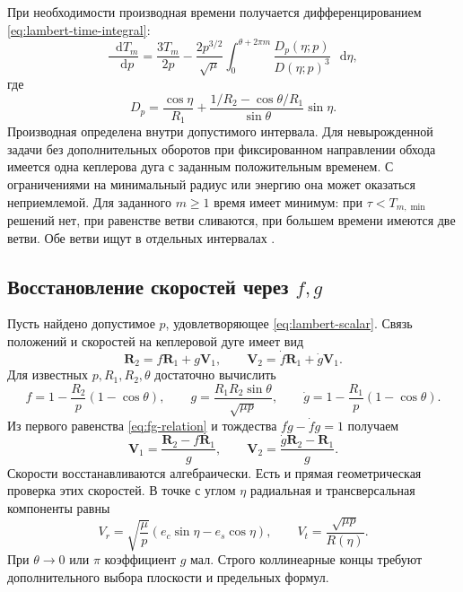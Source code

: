 \documentclass[a4paper,11pt]{article}
\newcommand{\dd}{\mathop{}\!\mathrm d}
\numberwithin{equation}{section}
\theoremstyle{remark}
\newcommand{\vect}[1]{\boldsymbol{#1}}
\begin{document}
При необходимости производная времени получается
дифференцированием \eqref{eq:lambert-time-integral}:
\begin{equation}
 \frac{\dd T_m}{\dd p}
 =\frac{3T_m}{2p}
  -\frac{2p^{3/2}}{\sqrt\mu}
   \int_0^{\theta+2\pi m}
           \frac{D_p(\eta;p)}{D(\eta;p)^3}\,\dd\eta,
 \label{eq:time-derivative}
\end{equation}
где
\[
 D_p=\frac{\cos\eta}{R_1}
  +\frac{1/R_2-\cos\theta/R_1}{\sin\theta}\sin\eta.
\]
Производная определена внутри допустимого интервала.
Для невырожденной задачи без дополнительных оборотов
при фиксированном направлении обхода имеется одна
кеплерова дуга с заданным положительным временем.
С ограничениями на минимальный радиус или энергию она может
оказаться неприемлемой. Для заданного $m\ge1$ время имеет
минимум: при $\tau<T_{m,\min}$ решений нет, при равенстве
ветви сливаются, при большем времени имеются две ветви.
Обе ветви ищут в отдельных интервалах \cite{izzo}.

\subsection{Восстановление скоростей через \texorpdfstring{$f,g$}{f,g}}

Пусть найдено допустимое $p$, удовлетворяющее
\eqref{eq:lambert-scalar}. Связь положений и скоростей
на кеплеровой дуге имеет вид
\begin{equation}
 \vect R_2=f\vect R_1+g\vect V_1,\qquad
 \vect V_2=\dot f\vect R_1+\dot g\vect V_1.
 \label{eq:fg-relation}
\end{equation}
Для известных $p,R_1,R_2,\theta$ достаточно вычислить
\begin{equation}
 f=1-\frac{R_2}{p}(1-\cos\theta),\qquad
 g=\frac{R_1R_2\sin\theta}{\sqrt{\mu p}},\qquad
 \dot g=1-\frac{R_1}{p}(1-\cos\theta).
 \label{eq:fg-coefficients}
\end{equation}
Из первого равенства \eqref{eq:fg-relation} и тождества
$f\dot g-\dot f g=1$ получаем
\begin{equation}
 \boxed{\vect V_1=\frac{\vect R_2-f\vect R_1}{g},\qquad
 \vect V_2=\frac{\dot g\vect R_2-\vect R_1}{g}.}
 \label{eq:lambert-velocities}
\end{equation}
Скорости восстанавливаются алгебраически.
Есть и прямая геометрическая проверка этих скоростей.
В точке с углом $\eta$ радиальная и трансверсальная
компоненты равны
\begin{equation}
 V_r=\sqrt{\frac\mu p}
          (e_c\sin\eta-e_s\cos\eta),\qquad
 V_t=\frac{\sqrt{\mu p}}{R(\eta)}.
 \label{eq:conic-velocities}
\end{equation}
При $\theta\to0$ или $\pi$ коэффициент $g$ мал.
Строго коллинеарные концы требуют дополнительного выбора
плоскости и предельных формул.
\end{document}
